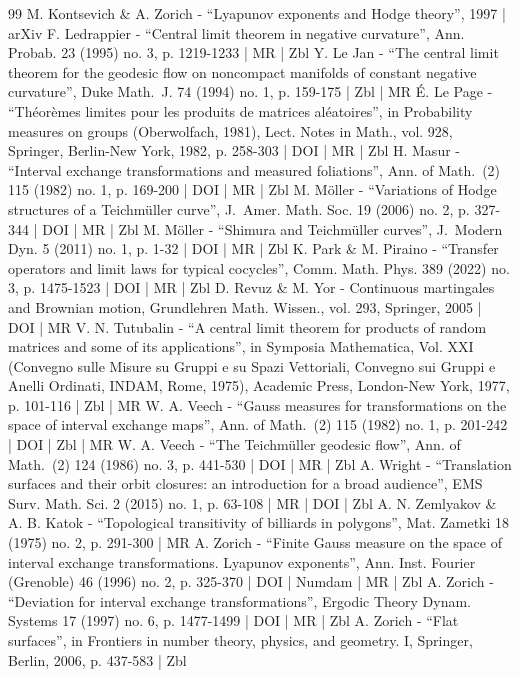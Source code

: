 \begin{thebibliography}{99}
M. Kontsevich \& A. Zorich - “Lyapunov exponents and Hodge theory”, 1997 | arXiv
F. Ledrappier - “Central limit theorem in negative curvature”, Ann. Probab. 23 (1995) no. 3, p. 1219-1233 | MR | Zbl
Y. Le Jan - “The central limit theorem for the geodesic flow on noncompact manifolds of constant negative curvature”, Duke Math. J. 74 (1994) no. 1, p. 159-175 | Zbl | MR
É. Le Page - “Théorèmes limites pour les produits de matrices aléatoires”, in Probability measures on groups (Oberwolfach, 1981), Lect. Notes in Math., vol. 928, Springer, Berlin-New York, 1982, p. 258-303 | DOI | MR | Zbl
H. Masur - “Interval exchange transformations and measured foliations”, Ann. of Math. (2) 115 (1982) no. 1, p. 169-200 | DOI | MR | Zbl
M. Möller - “Variations of Hodge structures of a Teichmüller curve”, J. Amer. Math. Soc. 19 (2006) no. 2, p. 327-344 | DOI | MR | Zbl
M. Möller - “Shimura and Teichmüller curves”, J. Modern Dyn. 5 (2011) no. 1, p. 1-32 | DOI | MR | Zbl
K. Park \& M. Piraino - “Transfer operators and limit laws for typical cocycles”, Comm. Math. Phys. 389 (2022) no. 3, p. 1475-1523 | DOI | MR | Zbl
D. Revuz \& M. Yor - Continuous martingales and Brownian motion, Grundlehren Math. Wissen., vol. 293, Springer, 2005 | DOI | MR
V. N. Tutubalin - “A central limit theorem for products of random matrices and some of its applications”, in Symposia Mathematica, Vol. XXI (Convegno sulle Misure su Gruppi e su Spazi Vettoriali, Convegno sui Gruppi e Anelli Ordinati, INDAM, Rome, 1975), Academic Press, London-New York, 1977, p. 101-116 | Zbl | MR
W. A. Veech - “Gauss measures for transformations on the space of interval exchange maps”, Ann. of Math. (2) 115 (1982) no. 1, p. 201-242 | DOI | Zbl | MR
W. A. Veech - “The Teichmüller geodesic flow”, Ann. of Math. (2) 124 (1986) no. 3, p. 441-530 | DOI | MR | Zbl
A. Wright - “Translation surfaces and their orbit closures: an introduction for a broad audience”, EMS Surv. Math. Sci. 2 (2015) no. 1, p. 63-108 | MR | DOI | Zbl
A. N. Zemlyakov \& A. B. Katok - “Topological transitivity of billiards in polygons”, Mat. Zametki 18 (1975) no. 2, p. 291-300 | MR
A. Zorich - “Finite Gauss measure on the space of interval exchange transformations. Lyapunov exponents”, Ann. Inst. Fourier (Grenoble) 46 (1996) no. 2, p. 325-370 | DOI | Numdam | MR | Zbl
A. Zorich - “Deviation for interval exchange transformations”, Ergodic Theory Dynam. Systems 17 (1997) no. 6, p. 1477-1499 | DOI | MR | Zbl
A. Zorich - “Flat surfaces”, in Frontiers in number theory, physics, and geometry. I, Springer, Berlin, 2006, p. 437-583 | Zbl
\end{thebibliography}
